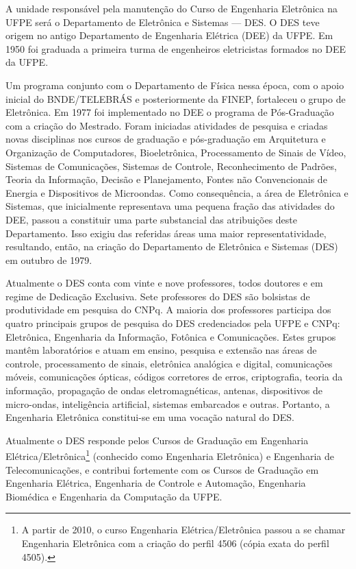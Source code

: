 A unidade responsável pela manutenção do Curso de Engenharia Eletrônica na UFPE será o Departamento de Eletrônica e Sistemas — DES. O DES teve origem no antigo Departamento de Engenharia Elétrica (DEE) da UFPE. Em 1950 foi graduada a primeira turma de engenheiros eletricistas formados no DEE da UFPE.

Um programa conjunto com o Departamento de Física nessa época, com o apoio inicial do BNDE/TELEBRÁS e posteriormente da FINEP, fortaleceu o grupo de Eletrônica. Em 1977 foi implementado no DEE o programa de Pós-Graduação com a criação do Mestrado. Foram iniciadas atividades de pesquisa e criadas novas disciplinas nos cursos de graduação e pós-graduação em Arquitetura e Organização de Computadores, Bioeletrônica, Processamento de Sinais de Vídeo, Sistemas de Comunicações, Sistemas de Controle, Reconhecimento de Padrões, Teoria da Informação, Decisão e Planejamento, Fontes não Convencionais de Energia e Dispositivos de Microondas.  Como consequência, a área de Eletrônica e Sistemas, que inicialmente representava uma pequena fração das atividades do DEE, passou a constituir uma parte substancial das atribuições deste Departamento. Isso exigiu das referidas áreas uma maior representatividade, resultando, então, na criação do Departamento de Eletrônica e Sistemas (DES) em outubro de 1979.

Atualmente o DES conta com vinte e nove professores, todos doutores e em regime de Dedicação Exclusiva. Sete professores do DES são bolsistas de produtividade em pesquisa do CNPq. A maioria dos professores participa dos quatro principais grupos de pesquisa do DES credenciados pela UFPE e CNPq: Eletrônica, Engenharia da Informação, Fotônica e Comunicações. Estes grupos mantêm laboratórios e atuam em ensino, pesquisa e extensão nas áreas de controle, processamento de sinais, eletrônica analógica e digital, comunicações móveis, comunicações ópticas, códigos corretores de erros, criptografia, teoria da informação, propagação de ondas eletromagnéticas, antenas, dispositivos de micro-ondas, inteligência artificial, sistemas embarcados e outras. Portanto, a Engenharia Eletrônica constitui-se em uma vocação natural do DES.

Atualmente o DES responde pelos Cursos de Graduação em Engenharia Elétrica/Eletrônica\footnote{A partir de 2010, o curso Engenharia Elétrica/Eletrônica passou a se chamar Engenharia Eletrônica com a criação do perfil 4506 (cópia exata do perfil 4505).
} (conhecido como Engenharia Eletrônica) e Engenharia de Telecomunicações, e contribui fortemente com os Cursos de Graduação em Engenharia Elétrica, Engenharia de Controle e Automação, Engenharia Biomédica e Engenharia da Computação da UFPE.
